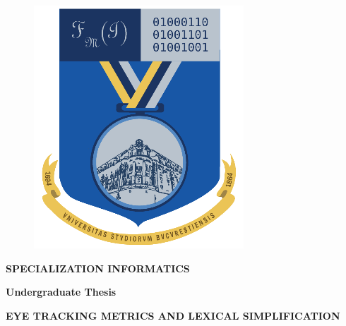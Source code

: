 \begin{titlepage}
\begin{figure}[!htb]
\begin{minipage}{0.5\textwidth}
\begin{center}
{                }
            \end{center}
        \end{minipage}
        \begin{minipage}{0.2\textwidth}
            \includegraphics[width=\linewidth]{"images/logo-fmi.png"}
        \end{minipage}
    \end{figure}
    
    \begin{center}
    \textbf{SPECIALIZATION INFORMATICS}
    \end{center}
    
    \vspace{1cm}
    
    \begin{center}
    \Large \textbf{Undergraduate Thesis}
    \end{center}
    
    \begin{center}
    \huge \textbf{\MakeUppercase{Eye Tracking Metrics and Lexical Simplification}}
    \end{center}
    

\end{titlepage}
